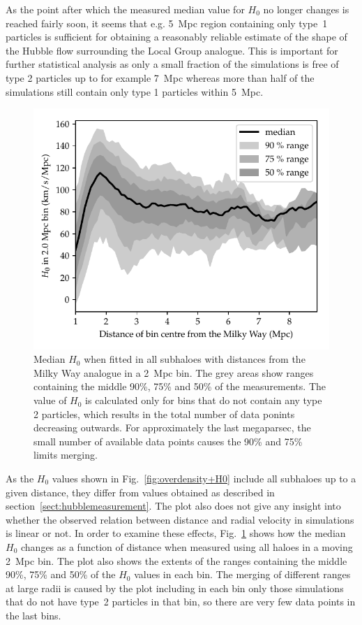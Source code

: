 \documentclass[english, oneside]{HYgradu}
\begin{document}
As the point after which the measured median value for $H_0$ no longer changes is reached fairly soon, it seems that e.g. 5~Mpc region containing only type~1 particles is sufficient for obtaining a reasonably reliable estimate of the shape of the Hubble flow surrounding the Local Group analogue. This is important for further statistical analysis as only a small fraction of the simulations is free of type 2 particles up to for example 7~Mpc whereas more than half of the simulations still contain only type 1 particles within 5~Mpc.

\begin{figure}
    \centering
    \includegraphics{kuvat/shelledH0.pdf}
    \caption{Median $H_0$ when fitted in all subhaloes with distances from the Milky Way analogue in a 2~Mpc bin. The grey areas show ranges containing the middle 90\%, 75\% and 50\% of the measurements. The value of $H_0$ is calculated only for bins that do not contain any type 2 particles, which results in the total number of data ponints decreasing outwards. For approximately the last megaparsec, the small number of available data points causes the 90\% and 75\% limits merging.}\label{fig:shelledH0}
\end{figure}

As the $H_0$ values shown in Fig.~\ref{fig:overdensity+H0} include all subhaloes up to a given distance, they  differ from values obtained as described in section~\ref{sect:hubblemeasurement}. The plot also does not give  any insight into whether the observed relation between distance and radial velocity in simulations is linear or not. In order to examine these effects, Fig.~\ref{fig:shelledH0} shows how the median $H_0$ changes as a function of distance when measured using all haloes in a moving 2~Mpc bin. The plot also shows the extents of the ranges containing the middle 90\%, 75\% and 50\% of the $H_0$ values in each bin. The merging of different ranges at large radii is caused by the plot including in each bin only those simulations that do not have type~2 particles in that bin, so there are very few data points in the last bins.
\end{document}
